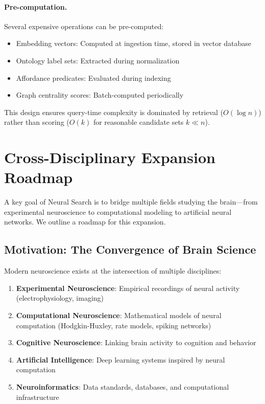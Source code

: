 \documentclass{article}
\theoremstyle{definition}
\begin{document}
\paragraph{Pre-computation.} Several expensive operations can be pre-computed:
\begin{itemize}
    \item Embedding vectors: Computed at ingestion time, stored in vector database
    \item Ontology label sets: Extracted during normalization
    \item Affordance predicates: Evaluated during indexing
    \item Graph centrality scores: Batch-computed periodically
\end{itemize}

This design ensures query-time complexity is dominated by retrieval ($O(\log n)$) rather than scoring ($O(k)$ for reasonable candidate sets $k \ll n$).

\section{Cross-Disciplinary Expansion Roadmap}
\label{sec:expansion}

A key goal of Neural Search is to bridge multiple fields studying the brain---from experimental neuroscience to computational modeling to artificial neural networks. We outline a roadmap for this expansion.

\subsection{Motivation: The Convergence of Brain Science}

Modern neuroscience exists at the intersection of multiple disciplines:

\begin{enumerate}
    \item \textbf{Experimental Neuroscience}: Empirical recordings of neural activity (electrophysiology, imaging)
    \item \textbf{Computational Neuroscience}: Mathematical models of neural computation (Hodgkin-Huxley, rate models, spiking networks)
    \item \textbf{Cognitive Neuroscience}: Linking brain activity to cognition and behavior
    \item \textbf{Artificial Intelligence}: Deep learning systems inspired by neural computation
    \item \textbf{Neuroinformatics}: Data standards, databases, and computational infrastructure
\end{enumerate}
\end{document}
